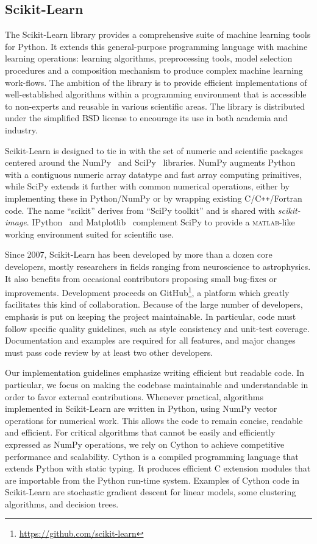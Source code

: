 \subsection{Scikit-Learn}

The Scikit-Learn library provides a comprehensive suite of machine learning
tools for Python. It extends this general-purpose programming language with
machine learning operations: learning algorithms, preprocessing tools, model
selection procedures and a composition mechanism to produce complex machine
learning work-flows. The ambition of the library is to provide efficient
implementations of well-established algorithms within a programming environment
that is accessible to non-experts and reusable in various scientific areas. The
library is distributed under the simplified BSD license to encourage its use in
both academia and industry.

Scikit-Learn is designed to tie in with the set of numeric and scientific
packages centered around the NumPy~\citep{oliphant:2007} and
SciPy~\citep{vanderwalt:2011} libraries. NumPy augments Python with a
contiguous numeric array datatype and fast array computing primitives, while
SciPy extends it further with common numerical operations, either by
implementing these in Python/NumPy or by wrapping existing
C/C{}\verb!++!/Fortran code. The name ``scikit'' derives from ``SciPy toolkit''
and is shared with \textit{scikit-image}. IPython~\citep{perez:2007} and
Matplotlib~\citep{hunter:2007} complement SciPy to provide a
\textsc{matlab}-like working environment suited for scientific use.

Since 2007, Scikit-Learn has been developed by more than a dozen core
developers, mostly researchers in fields ranging from neuro\-science to
astro\-physics. It also benefits from occasional contributors proposing small
bug-fixes or improvements. Development proceeds on
GitHub\footnote{\url{https://github.com/scikit-learn}}, a platform which
greatly facilitates this kind of collaboration. Because of the large number of
developers, emphasis is put on keeping the project maintainable. In particular,
code must follow specific quality guidelines, such as style consistency and
unit-test coverage. Documentation and examples are required for all features,
and major changes must pass code review by at least two other developers.

Our implementation guidelines emphasize writing efficient but readable code. In
particular, we focus on making the codebase maintainable and understandable in
order to favor external contributions. Whenever practical, algorithms
implemented in Scikit-Learn are written in Python, using NumPy vector
operations for numerical work. This allows the code to remain concise, readable
and efficient. For critical algorithms that cannot be easily and efficiently
expressed as NumPy operations, we rely on Cython \citep{behnel:2011} to achieve
competitive performance and scalability. Cython is a compiled programming
language that extends Python with static typing. It produces efficient C
extension modules that are importable from the Python run-time system. Examples
of Cython code in Scikit-Learn are stochastic gradient descent for linear
models, some clustering algorithms, and decision trees.


